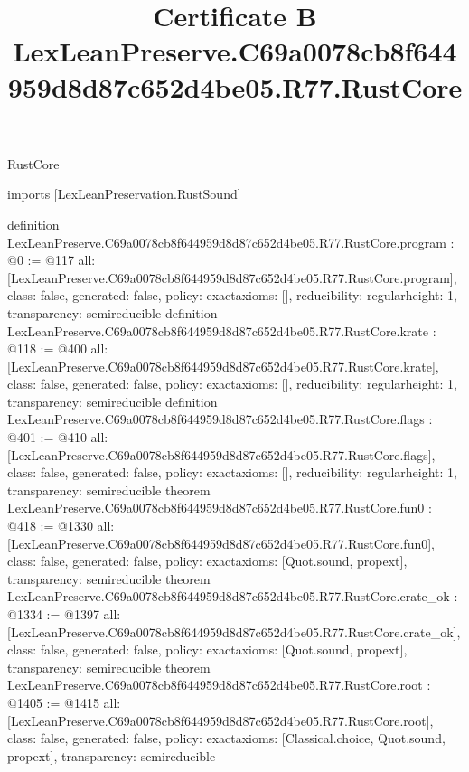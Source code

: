 \begin{lexlean}{RustCore}
\title{Certificate B LexLeanPreserve.C69a0078cb8f644959d8d87c652d4be05.R77.RustCore}
\begin{coremodule}
imports [LexLeanPreservation.RustSound]

definition LexLeanPreserve.C69a0078cb8f644959d8d87c652d4be05.R77.RustCore.program : @0 := @117 {
  all: [LexLeanPreserve.C69a0078cb8f644959d8d87c652d4be05.R77.RustCore.program],
  class: false,
  generated: false,
  policy: exact{axioms: []},
  reducibility: regular{height: 1},
  transparency: semireducible
}
definition LexLeanPreserve.C69a0078cb8f644959d8d87c652d4be05.R77.RustCore.krate : @118 := @400 {
  all: [LexLeanPreserve.C69a0078cb8f644959d8d87c652d4be05.R77.RustCore.krate],
  class: false,
  generated: false,
  policy: exact{axioms: []},
  reducibility: regular{height: 1},
  transparency: semireducible
}
definition LexLeanPreserve.C69a0078cb8f644959d8d87c652d4be05.R77.RustCore.flags : @401 := @410 {
  all: [LexLeanPreserve.C69a0078cb8f644959d8d87c652d4be05.R77.RustCore.flags],
  class: false,
  generated: false,
  policy: exact{axioms: []},
  reducibility: regular{height: 1},
  transparency: semireducible
}
theorem LexLeanPreserve.C69a0078cb8f644959d8d87c652d4be05.R77.RustCore.fun0 : @418 := @1330 {
  all: [LexLeanPreserve.C69a0078cb8f644959d8d87c652d4be05.R77.RustCore.fun0],
  class: false,
  generated: false,
  policy: exact{axioms: [Quot.sound, propext]},
  transparency: semireducible
}
theorem LexLeanPreserve.C69a0078cb8f644959d8d87c652d4be05.R77.RustCore.crate_ok : @1334 := @1397 {
  all: [LexLeanPreserve.C69a0078cb8f644959d8d87c652d4be05.R77.RustCore.crate_ok],
  class: false,
  generated: false,
  policy: exact{axioms: [Quot.sound, propext]},
  transparency: semireducible
}
theorem LexLeanPreserve.C69a0078cb8f644959d8d87c652d4be05.R77.RustCore.root : @1405 := @1415 {
  all: [LexLeanPreserve.C69a0078cb8f644959d8d87c652d4be05.R77.RustCore.root],
  class: false,
  generated: false,
  policy: exact{axioms: [Classical.choice, Quot.sound, propext]},
  transparency: semireducible
}


\end{coremodule}
\end{lexlean}
